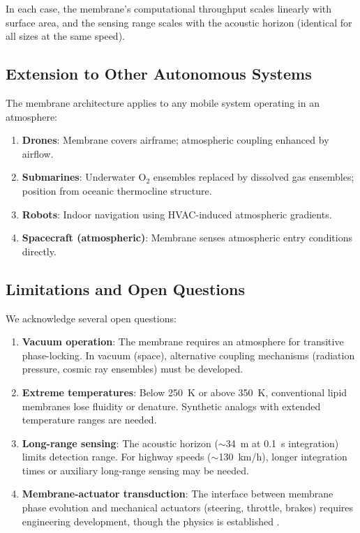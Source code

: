 \documentclass[twocolumn,10pt]{article}
\theoremstyle{definition}
\theoremstyle{remark}
\begin{document}
In each case, the membrane's computational throughput scales linearly with surface area, and the sensing range scales with the acoustic horizon (identical for all sizes at the same speed).

\subsection{Extension to Other Autonomous Systems}

The membrane architecture applies to any mobile system operating in an atmosphere:

\begin{enumerate}[label=(\roman*)]
  \item \textbf{Drones}: Membrane covers airframe; atmospheric coupling enhanced by airflow.
  \item \textbf{Submarines}: Underwater $\mathrm{O}_2$ ensembles replaced by dissolved gas ensembles; position from oceanic thermocline structure.
  \item \textbf{Robots}: Indoor navigation using HVAC-induced atmospheric gradients.
  \item \textbf{Spacecraft (atmospheric)}: Membrane senses atmospheric entry conditions directly.
\end{enumerate}

\subsection{Limitations and Open Questions}

We acknowledge several open questions:

\begin{enumerate}[label=(\roman*)]
  \item \textbf{Vacuum operation}: The membrane requires an atmosphere for transitive phase-locking. In vacuum (space), alternative coupling mechanisms (radiation pressure, cosmic ray ensembles) must be developed.
  \item \textbf{Extreme temperatures}: Below \SI{250}{K} or above \SI{350}{K}, conventional lipid membranes lose fluidity or denature. Synthetic analogs with extended temperature ranges are needed.
  \item \textbf{Long-range sensing}: The acoustic horizon ($\sim$\SI{34}{m} at \SI{0.1}{s} integration) limits detection range. For highway speeds ($\sim$\SI{130}{km/h}), longer integration times or auxiliary long-range sensing may be needed.
  \item \textbf{Membrane-actuator transduction}: The interface between membrane phase evolution and mechanical actuators (steering, throttle, brakes) requires engineering development, though the physics is established \cite{sachikonye2025circuits}.
\end{enumerate}
\end{document}
